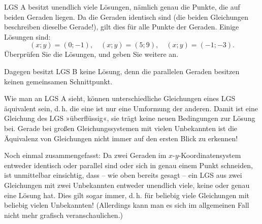 \begin{center}
\end{center}

LGS A besitzt unendlich viele Lösungen, nämlich genau die Punkte, die auf beiden Geraden liegen. Da die Geraden identisch sind (die beiden Gleichungen beschreiben dieselbe Gerade!), gilt dies für alle Punkte der Geraden. Einige Lösungen sind:
\[ (x;y) = (0;-1), \quad (x;y) = (5;9), \quad (x;y) = (-1;-3) . \]
Überprüfen Sie die Lösungen, und geben Sie weitere an.

Dagegen besitzt LGS B keine Lösung, denn die parallelen Geraden besitzen keinen gemeinsamen Schnittpunkt.

Wie man an LGS A sieht, können unterschiedliche Gleichungen eines LGS äquivalent sein, d.\,h. die eine ist nur eine Umformung der anderen. Damit ist eine Gleichung des LGS »überflüssig«, sie trägt keine neuen Bedingungen zur Lösung bei. Gerade bei großen Gleichungssystemen mit vielen Unbekannten ist die Äquivalenz von Gleichungen nicht immer auf den ersten Blick zu erkennen!

Noch einmal zusammengefasst: Da zwei Geraden im $x$-$y$-Koordinatensystem entweder identisch oder parallel sind oder sich in genau einem Punkt schneiden, ist unmittelbar einsichtig, dass -- wie oben bereits gesagt -- ein LGS aus zwei Gleichungen mit zwei Unbekannten entweder unendlich viele, keine oder genau eine Lösung hat. Dies gilt sogar immer, d.\,h. für beliebig viele Gleichungen mit beliebig vielen Unbekannten! (Allerdings kann man es sich im allgemeinen Fall nicht mehr grafisch veranschaulichen.)

